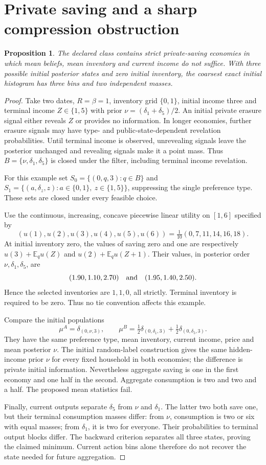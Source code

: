 \documentclass[11pt]{article}
\newtheorem{proposition}{Proposition}
\newcommand{\E}{\mathbb E}
\begin{document}
\section{Private saving and a sharp compression obstruction}
\begin{proposition}\label{example}
The declared class contains strict private-saving economies in which mean beliefs, mean inventory and current income do not suffice. With three possible initial posterior states and zero initial inventory, the coarsest exact initial histogram has three bins and two independent masses.
\end{proposition}
\begin{proof}
Take two dates, $R=\beta=1$, inventory grid $\{0,1\}$, initial income three and terminal income $Z\in\{1,5\}$ with prior
$\nu=(\delta_1+\delta_5)/2$. An initial private erasure signal either reveals $Z$ or provides no information. In longer economies, further erasure signals may have type- and public-state-dependent revelation probabilities. Until terminal income is observed, unrevealing signals leave the posterior unchanged and revealing signals make it a point mass. Thus
$B=\{\nu,\delta_1,\delta_5\}$ is closed under the filter, including terminal income revelation.

For this example set $S_0=\{(0,q,3):q\in B\}$ and
$S_1=\{(a,\delta_z,z):a\in\{0,1\},\ z\in\{1,5\}\}$, suppressing the single preference type. These sets are closed under every feasible choice.

Use the continuous, increasing, concave piecewise linear utility on $[1,6]$ specified by
\[
 (u(1),u(2),u(3),u(4),u(5),u(6))
                  =\tfrac1{10}(0,7,11,14,16,18).
\]
At initial inventory zero, the values of saving zero and one are respectively $u(3)+\E_q u(Z)$ and $u(2)+\E_q u(Z+1)$. Their values, in posterior order $\nu,\delta_1,\delta_5$, are
\[
 (1.90,1.10,2.70)\quad\hbox{and}\quad(1.95,1.40,2.50).
\]
Hence the selected inventories are $1,1,0$, all strictly. Terminal inventory is required to be zero. Thus no tie convention affects this example.

Compare the initial populations
\[
 \mu^A=\delta_{(0,\nu,3)},\qquad
 \mu^B=\tfrac12\delta_{(0,\delta_1,3)}+
        \tfrac12\delta_{(0,\delta_5,3)}.
\]
They have the same preference type, mean inventory, current income, price and mean posterior $\nu$. The initial random-label construction gives the same hidden-income prior $\nu$ for every fixed household in both economies; the difference is private initial information. Nevertheless aggregate saving is one in the first economy and one half in the second. Aggregate consumption is two and two and a half. The proposed mean statistics fail.

Finally, current outputs separate $\delta_5$ from $\nu$ and $\delta_1$. The latter two both save one, but their terminal consumption masses differ: from $\nu$, consumption is two or six with equal masses; from $\delta_1$, it is two for everyone. Their probabilities to terminal output blocks differ. The backward criterion separates all three states, proving the claimed minimum. Current action bins alone therefore do not recover the state needed for future aggregation.
\end{proof}
\end{document}
